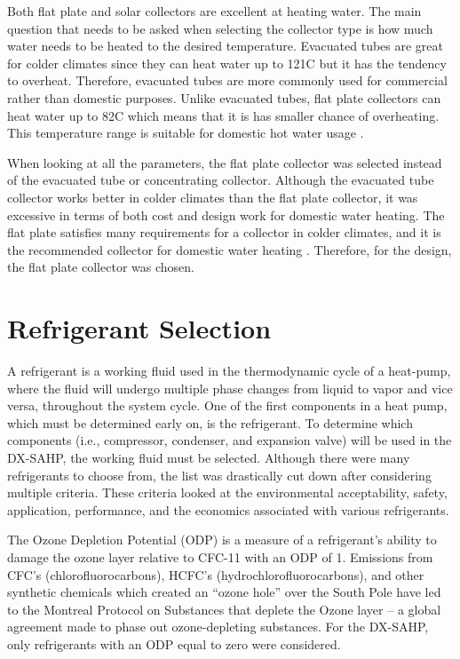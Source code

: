 \medskip
Both flat plate and solar collectors are excellent at heating water. The main question that needs to be asked when selecting the collector type is how much water needs to be heated to the desired temperature. Evacuated tubes are great for colder climates since they can heat water up to 121\textdegree C but it has the tendency to overheat. Therefore, evacuated tubes are more commonly used for commercial rather than domestic purposes. Unlike evacuated tubes, flat plate collectors can heat water up to 82\textdegree C which means that it is has smaller chance of overheating. This temperature range is suitable for domestic hot water usage \cite{flat_plate}.

\medskip
When looking at all the parameters, the flat plate collector was selected instead of the evacuated tube or concentrating collector. Although the evacuated tube collector works better in colder climates than the flat plate collector, it was excessive in terms of both cost and design work for domestic water heating. The flat plate satisfies many requirements for a collector in colder climates, and it is the recommended collector for domestic water heating \cite{flat_plate}. Therefore, for the design, the flat plate collector was chosen.

\section{Refrigerant Selection}

A refrigerant is a working fluid used in the thermodynamic cycle of a heat-pump, where the fluid will undergo multiple phase changes from liquid to vapor and vice versa, throughout the system cycle. One of the first components in a heat pump, which must be determined early on, is the refrigerant. To determine which components (i.e., compressor, condenser, and expansion valve) will be used in the DX-SAHP, the working fluid must be selected. Although there were many refrigerants to choose from, the list was drastically cut down after considering multiple criteria. These criteria looked at the environmental acceptability, safety, application, performance, and the economics associated with various refrigerants.

\medskip
The Ozone Depletion Potential (ODP) is a measure of a refrigerant’s ability to damage the ozone layer relative to CFC-11 with an ODP of 1. Emissions from CFC’s (chlorofluorocarbons), HCFC’s (hydrochlorofluorocarbons), and other synthetic chemicals which created an “ozone hole” over the South Pole \cite{ozone_layer} have led to the Montreal Protocol on Substances that deplete the Ozone layer \cite{odp} – a global agreement made to phase out ozone-depleting substances. For the DX-SAHP, only refrigerants with an ODP equal to zero were considered.

